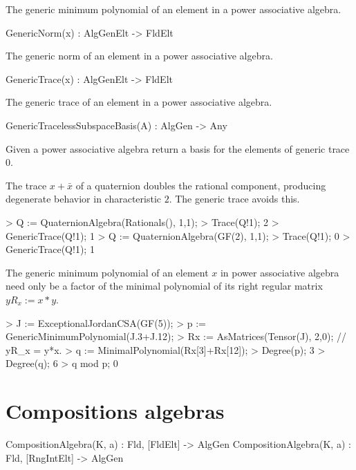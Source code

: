 The generic minimum polynomial of an element in a power associative algebra.

\begin{intrinsics}
GenericNorm(x) : AlgGenElt -> FldElt
\end{intrinsics}

The generic norm of an element in a power associative algebra.

\begin{intrinsics}
GenericTrace(x) : AlgGenElt -> FldElt
\end{intrinsics}

The generic trace of an element in a power associative algebra.

\begin{intrinsics}
GenericTracelessSubspaceBasis(A) : AlgGen -> Any
\end{intrinsics}

Given a power associative algebra return a basis for the elements of generic trace 0.

\begin{example}[TenGeneric]

The trace $x+\bar{x}$ of a quaternion doubles the rational component, producing
degenerate behavior in characteristic $2$.  The generic trace avoids this.
\begin{code}
> Q := QuaternionAlgebra(Rationals(), 1,1);
> Trace(Q!1);        
2
> GenericTrace(Q!1);
1
> Q := QuaternionAlgebra(GF(2), 1,1);  
> Trace(Q!1);
0
> GenericTrace(Q!1);
1
\end{code}

The generic minimum polynomial of an element $x$ in power associative algebra
need only be a factor of the minimal polynomial of its right regular matrix $yR_x:=x*y$.

\begin{code}
> J := ExceptionalJordanCSA(GF(5));
> p := GenericMinimumPolynomial(J.3+J.12);
> Rx := AsMatrices(Tensor(J), 2,0);     // yR_x = y*x.
> q := MinimalPolynomial(Rx[3]+Rx[12]); 
> Degree(p);
3
> Degree(q);
6
> q mod p;
0
\end{code}
\end{example}

\section{Compositions algebras}

\begin{intrinsics}
CompositionAlgebra(K, a) : Fld, [FldElt] -> AlgGen
CompositionAlgebra(K, a) : Fld, [RngIntElt] -> AlgGen
\end{intrinsics}

